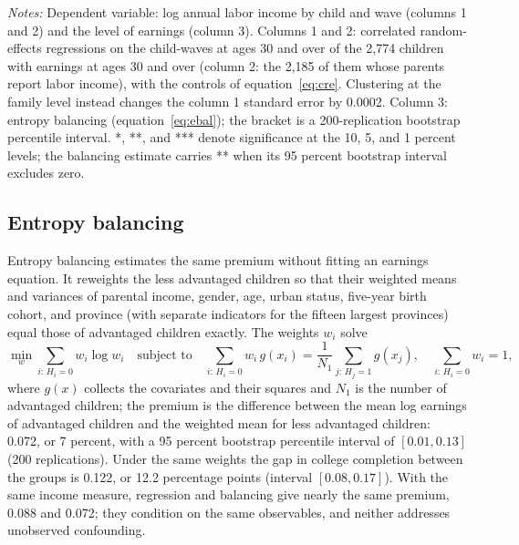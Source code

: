 \documentclass[11pt]{article}
\begin{document}
\begin{table}[t]
\centering
\small
\caption{The premium net of parental income: three estimates.}
\label{tab:cre}

\par\smallskip
\begin{minipage}{0.92\textwidth}
\footnotesize\emph{Notes:} Dependent variable: log annual labor income
by child and wave (columns 1 and 2) and the level of earnings (column
3). Columns 1 and 2: correlated random-effects regressions on the child-waves at ages 30 and over of the 2,774 children with earnings at ages 30 and over (column 2: the 2,185 of them whose parents report labor income), with the controls of equation~\eqref{eq:cre}. Clustering at the family level instead changes the column 1 standard error by 0.0002. Column 3: entropy balancing (equation~\eqref{eq:ebal}); the bracket is a 200-replication bootstrap percentile interval.
*, **, and *** denote significance at the 10, 5, and 1 percent levels; the balancing estimate carries ** when its 95 percent bootstrap interval excludes zero.
\end{minipage}
\end{table}

\subsection{Entropy balancing}
\label{sec:ebal}

Entropy balancing \citep{Hainmueller2012} estimates the same premium without fitting an earnings equation. It reweights the less advantaged children so that their weighted means and variances
of parental income, gender, age, urban status, five-year birth cohort, and province (with separate indicators for the fifteen largest provinces)
equal those of advantaged children exactly. The weights $w_i$ solve
\begin{equation}
\min_{w} \sum_{i:\, H_i = 0} w_i \log w_i
\quad\text{subject to}\quad
\sum_{i:\, H_i = 0} w_i\, g(x_i) = \frac{1}{N_1}\sum_{j:\, H_j = 1} g(x_j),
\quad \sum_{i:\, H_i = 0} w_i = 1,
\label{eq:ebal}
\end{equation}
where $g(x)$ collects the covariates and their squares and $N_1$ is the number of advantaged children; the premium is the difference between the mean log earnings of advantaged children and the weighted mean for less advantaged children: 0.072, or 7 percent, with a 95 percent bootstrap percentile interval of $[0.01, 0.13]$ (200 replications). Under the same weights the
gap in college completion between the groups is 0.122, or 12.2 percentage points (interval $[0.08, 0.17]$). With the same income measure, regression and balancing give nearly the same premium, 0.088 and 0.072; they condition on the same observables, and neither addresses unobserved confounding.
\end{document}

